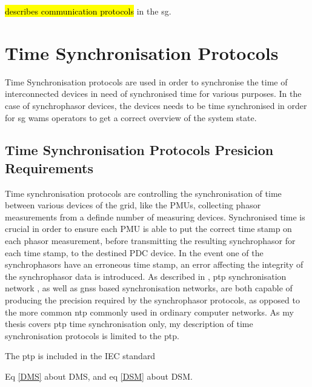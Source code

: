 \cite{2021arXiv210311657E} \hl{describes communication protocols} in the  \acrshort{sg}.













\section{Time Synchronisation Protocols}


Time Synchronisation protocols are used in order to synchronise the time of interconnected devices in need of synchronised time for various purposes. In the case of synchrophasor devices, the devices needs to be time synchronised in order for \acrshort{sg} \acrshort{wams} operators to get a correct overview of the system state.

\subsection{Time Synchronisation Protocols Presicion Requirements}
Time synchronisation protocols are controlling the synchronisation of time between various devices of the grid, like the PMUs, collecting phasor measurements from a definde number of measuring devices. Synchronised time is crucial in order to ensure each PMU is able to put the correct time stamp on each phasor measurement, before transmitting the resulting synchrophasor for each time stamp, to the destined PDC device. In the event one of the synchrophasors have an erroneous time stamp, an error affecting the integrity of the synchrophasor data is introduced. As described in \cite{moussa2016security}, \acrlong{ptp} synchronisation network
, as well as \acrlong{gnss} based synchronisation networks, are both capable of producing the precision required by the synchrophasor protocols, as opposed to the more common \acrfull{ntp} commonly used in ordinary computer networks. As my thesis covers \acrshort{ptp} time synchronisation only, my description of time synchronisation protocols is limited to the \acrfull{ptp}.



The \acrshort{ptp} is included in the IEC standard

Eq \ref{DMS} about DMS, and  eq \ref{DSM} about DSM.









